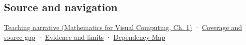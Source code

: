\subsection{Source and navigation}\label{appendix-2391db8052b1-source-and-navigation}

\hypertarget{appendix-2391db8052b1-source-and-navigation}{}

\href{../02-Mathematics-for-Visual-Computing/main.pdf\#nameddest=01-foundations-i-ch017-oriented-area-tells-us-which-side-of-the-panel-is-front}{Teaching narrative (Mathematics for Visual Computing, Ch. 1)} · \hyperref[appendix-fd090d982a15-phase-6---parts-501-600]{Coverage and source gap} · \hyperref[appendix-a103e7846d21-phase-6---source-analysis-and-verification]{Evidence and limits} · \hyperref[appendix-4ad47bdd269a]{Dependency Map}
